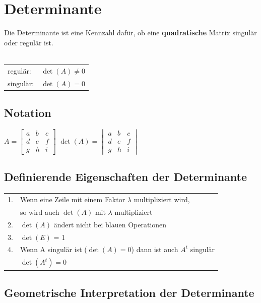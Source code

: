     
		 \section{Determinante}
		 Die Determinante ist eine Kennzahl dafür, ob eine \textbf{quadratische} Matrix singulär oder regulär ist. \\
		 \\
		  \begin{tabular}{ll}
		    regulär: & $\det(A) \neq 0$ \\
		    singulär: & $ \det(A) = 0$ \\
		  \end{tabular}
		    
		    \subsection{Notation}
		     $A = \begin{bmatrix}
		    			a & b & c \\
		    			d & e & f \\
		    			g & h & i 
		    		\end{bmatrix}$  \qquad  $\det(A) = \begin{vmatrix}
		    			a & b & c \\
		    			d & e & f \\
		    			g & h & i 
		    			\end{vmatrix}$ \\
		    
		    
		    \subsection{Definierende Eigenschaften der Determinante}
		    \begin{tabular}{ll}
		    1. & Wenn eine Zeile mit einem Faktor $\lambda$ multipliziert wird, \\ 
		    & so wird auch $\det(A)$ mit $\lambda$ multipliziert \\
		    2. & $\det(A)$ ändert nicht bei blauen Operationen \\
		    3. & $\det(E)$ = 1 \\
		    4. & Wenn A singulär ist ($\det(A) = 0$) dann ist auch $A^t$ singulär\\
		    & $\det(A^t) = 0$ \\
		    \end{tabular}

			\subsection{Geometrische Interpretation der Determinante}
